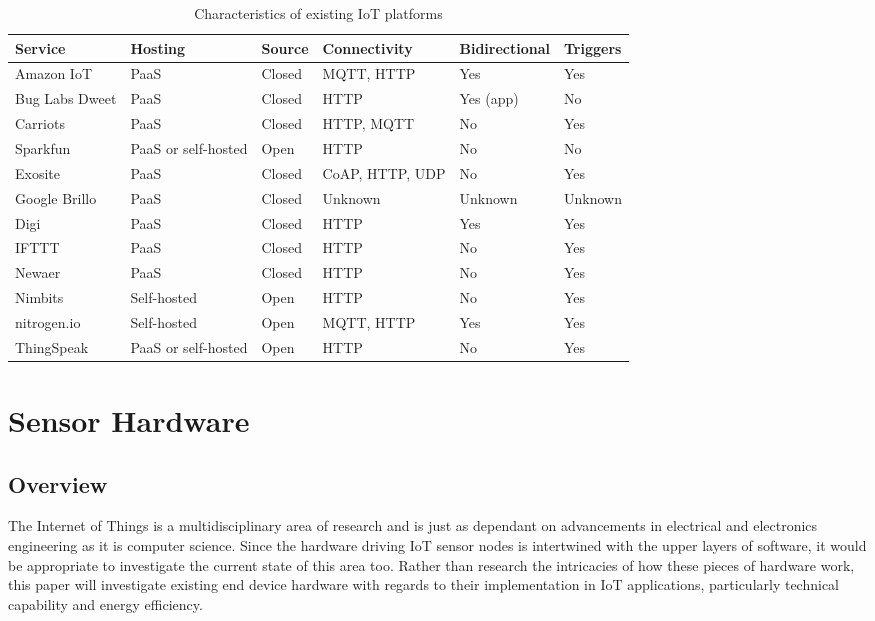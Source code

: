       \begin{table}
        \scriptsize
        \begin{tabularx}{\textwidth}{|X|X|X|X|X|X|}
          \hline
          \textbf{Service} & \textbf{Hosting} & \textbf{Source} & \textbf{Connectivity} & \textbf{Bidirectional} & \textbf{Triggers} \\ \hline
          Amazon IoT & PaaS & Closed & MQTT, HTTP & Yes & Yes \\ \hline
          Bug Labs Dweet & PaaS & Closed & HTTP & Yes (app) & No \\ \hline
          Carriots & PaaS & Closed & HTTP, MQTT & No & Yes \\ \hline
          Sparkfun & PaaS or self-hosted & Open & HTTP & No & No \\ \hline
          Exosite & PaaS & Closed & CoAP, HTTP, UDP & No & Yes \\ \hline
          Google Brillo & PaaS & Closed & Unknown & Unknown & Unknown \\ \hline
          Digi & PaaS & Closed & HTTP & Yes & Yes \\ \hline
          IFTTT & PaaS & Closed & HTTP & No & Yes \\ \hline
          Newaer & PaaS & Closed & HTTP & No & Yes \\ \hline
          Nimbits & Self-hosted & Open & HTTP & No & Yes \\ \hline
          nitrogen.io & Self-hosted & Open & MQTT, HTTP & Yes & Yes \\ \hline
          ThingSpeak & PaaS or self-hosted & Open & HTTP & No & Yes \\ \hline
        \end{tabularx}

        \caption{Characteristics of existing IoT platforms}\label{platform-characteristics}
      \end{table}
  \section{Sensor Hardware}
    \subsection{Overview}
      The Internet of Things is a multidisciplinary area of research and is just as dependant on advancements in electrical and electronics engineering as it is computer science. Since the hardware driving IoT sensor nodes is intertwined with the upper layers of software, it would be appropriate to investigate the current state of this area too. Rather than research the intricacies of how these pieces of hardware work, this paper will investigate existing end device hardware with regards to their implementation in IoT applications, particularly technical capability and energy efficiency.

